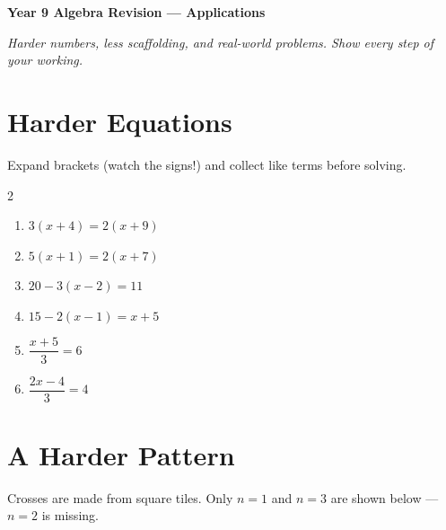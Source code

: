 \documentclass[11pt]{article}
\newcommand{\ans}{\hrulefill}
\begin{document}
\begin{center}
  {\Large\bfseries Year 9 Algebra Revision --- Applications}
\end{center}
\vspace{0.3em}
\noindent\textit{Harder numbers, less scaffolding, and real-world problems. Show every step of your working.}

\vspace{0.4em}
\section{Harder Equations}
\noindent Expand brackets (watch the signs!) and collect like terms before solving.

\begin{multicols}{2}
\begin{enumerate}
  \item $3(x + 4) = 2(x + 9)$ \ans
  \item $5(x + 1) = 2(x + 7)$ \ans
  \item $20 - 3(x - 2) = 11$ \ans
  \item $15 - 2(x - 1) = x + 5$ \ans
  \item $\dfrac{x+5}{3} = 6$ \ans
  \item $\dfrac{2x-4}{3} = 4$ \ans
\end{enumerate}
\end{multicols}

\section{A Harder Pattern}
\noindent Crosses are made from square tiles. Only $n=1$ and $n=3$ are shown below --- $n=2$ is missing.

\begin{center}
\end{center}
\end{document}
